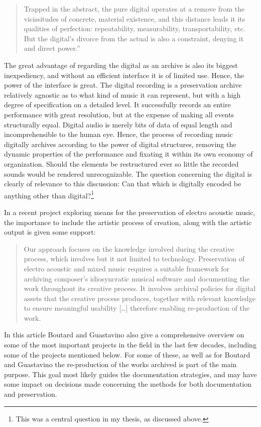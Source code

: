 \documentclass[11pt,a4paper]{article}
\begin{document}
\begin{quote}
Trapped in the abstract, the pure digital operates at a remove from the vicissitudes of concrete, material existence, and this distance leads it its qualities of perfection: repeatability, measurability, transportability, etc. But the digital's divorce from the actual is also a constraint, denying it and direct power.'' \citep[p. 79]{evens05}
\end{quote}

The great advantage of regarding the digital as an archive is also its biggest inexpediency, and without an efficient interface it is of limited use. Hence, the power of the interface is great. The digital recording is a preservation archive relatively agnostic as to what kind of music it can represent, but with a high degree of specification on a detailed level. It successfully records an entire performance with great resolution, but at the expense of making all events structurally equal. Digital audio is merely bits of data of equal length and incomprehensible to the human eye. Hence, the process of recording music digitally archives according to the power of digital structures, removing the dynamic properties of the performance and fixating it within its own economy of organization. Should the elements be restructured ever so little the recorded sounds would be rendered unrecognizable. The question concerning the digital is clearly of relevance to this discussion: Can that which is digitally encoded be anything other than digital?\footnote{This was a central question in my thesis, as discussed above.}

In a recent project exploring means for the preservation of electro acoustic music, the importance to include the artistic process of creation, along with the artistic output is given some support:
\begin{quote}
  Our approach focuses on the knowledge involved during the creative process, which involves but it not limited to technology. Preservation of electro acoustic and mixed music requires a suitable framework for archiving composer’s idiosyncratic musical software and documenting the work throughout its creative process. It involves archival policies for digital assets that the creative process produces, together with relevant knowledge to ensure meaningful usability [\ldots] therefore enabling re-production of the work. \citep{boutard2012}
\end{quote}
In this article Boutard and Guastavino also give a comprehensive overview on some of the most important projects in the field in the last few decades, including some of the projects mentioned below. For some of these, as well as for Boutard and Guastavino the re-production of the works archived is part of the main purpose. This goal most likely guides the documentation strategies, and may have some impact on decisions made concerning the methods for both documentation and preservation.
\end{document}
